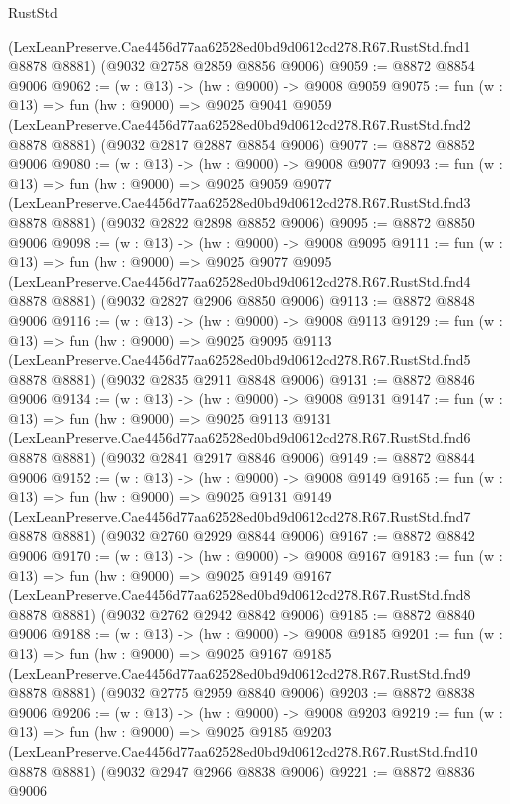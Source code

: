 \begin{lexlean}{RustStd}
\begin{coremodule}
    (LexLeanPreserve.Cae4456d77aa62528ed0bd9d0612cd278.R67.RustStd.fnd1 @8878 @8881)
    (@9032 @2758 @2859 @8856 @9006)
@9059 := @8872 @8854 @9006
@9062 := (w : @13) -> (hw : @9000) -> @9008 @9059
@9075 := fun (w : @13) =>
  fun (hw : @9000) =>
  @9025
    @9041
    @9059
    (LexLeanPreserve.Cae4456d77aa62528ed0bd9d0612cd278.R67.RustStd.fnd2 @8878 @8881)
    (@9032 @2817 @2887 @8854 @9006)
@9077 := @8872 @8852 @9006
@9080 := (w : @13) -> (hw : @9000) -> @9008 @9077
@9093 := fun (w : @13) =>
  fun (hw : @9000) =>
  @9025
    @9059
    @9077
    (LexLeanPreserve.Cae4456d77aa62528ed0bd9d0612cd278.R67.RustStd.fnd3 @8878 @8881)
    (@9032 @2822 @2898 @8852 @9006)
@9095 := @8872 @8850 @9006
@9098 := (w : @13) -> (hw : @9000) -> @9008 @9095
@9111 := fun (w : @13) =>
  fun (hw : @9000) =>
  @9025
    @9077
    @9095
    (LexLeanPreserve.Cae4456d77aa62528ed0bd9d0612cd278.R67.RustStd.fnd4 @8878 @8881)
    (@9032 @2827 @2906 @8850 @9006)
@9113 := @8872 @8848 @9006
@9116 := (w : @13) -> (hw : @9000) -> @9008 @9113
@9129 := fun (w : @13) =>
  fun (hw : @9000) =>
  @9025
    @9095
    @9113
    (LexLeanPreserve.Cae4456d77aa62528ed0bd9d0612cd278.R67.RustStd.fnd5 @8878 @8881)
    (@9032 @2835 @2911 @8848 @9006)
@9131 := @8872 @8846 @9006
@9134 := (w : @13) -> (hw : @9000) -> @9008 @9131
@9147 := fun (w : @13) =>
  fun (hw : @9000) =>
  @9025
    @9113
    @9131
    (LexLeanPreserve.Cae4456d77aa62528ed0bd9d0612cd278.R67.RustStd.fnd6 @8878 @8881)
    (@9032 @2841 @2917 @8846 @9006)
@9149 := @8872 @8844 @9006
@9152 := (w : @13) -> (hw : @9000) -> @9008 @9149
@9165 := fun (w : @13) =>
  fun (hw : @9000) =>
  @9025
    @9131
    @9149
    (LexLeanPreserve.Cae4456d77aa62528ed0bd9d0612cd278.R67.RustStd.fnd7 @8878 @8881)
    (@9032 @2760 @2929 @8844 @9006)
@9167 := @8872 @8842 @9006
@9170 := (w : @13) -> (hw : @9000) -> @9008 @9167
@9183 := fun (w : @13) =>
  fun (hw : @9000) =>
  @9025
    @9149
    @9167
    (LexLeanPreserve.Cae4456d77aa62528ed0bd9d0612cd278.R67.RustStd.fnd8 @8878 @8881)
    (@9032 @2762 @2942 @8842 @9006)
@9185 := @8872 @8840 @9006
@9188 := (w : @13) -> (hw : @9000) -> @9008 @9185
@9201 := fun (w : @13) =>
  fun (hw : @9000) =>
  @9025
    @9167
    @9185
    (LexLeanPreserve.Cae4456d77aa62528ed0bd9d0612cd278.R67.RustStd.fnd9 @8878 @8881)
    (@9032 @2775 @2959 @8840 @9006)
@9203 := @8872 @8838 @9006
@9206 := (w : @13) -> (hw : @9000) -> @9008 @9203
@9219 := fun (w : @13) =>
  fun (hw : @9000) =>
  @9025
    @9185
    @9203
    (LexLeanPreserve.Cae4456d77aa62528ed0bd9d0612cd278.R67.RustStd.fnd10 @8878 @8881)
    (@9032 @2947 @2966 @8838 @9006)
@9221 := @8872 @8836 @9006

\end{coremodule}
\end{lexlean}
